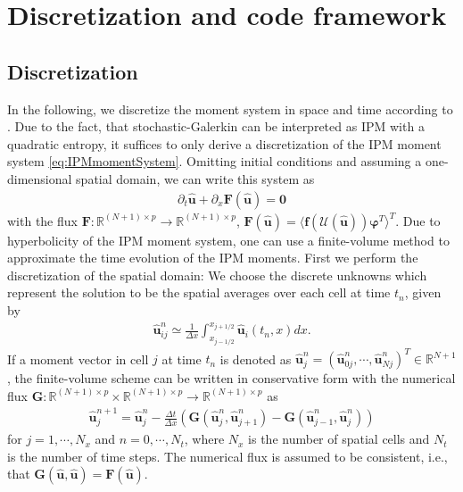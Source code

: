 \section{Discretization and code framework}
\label{sec:framework}
\subsection{Discretization}
In the following, we discretize the moment system in space and time according to \cite{kusch2017maximum}. Due to the fact, that stochastic-Galerkin can be interpreted as IPM with a quadratic entropy, it suffices to only derive a discretization of the IPM moment system \eqref{eq:IPMmomentSystem}.  
Omitting initial conditions and assuming a one-dimensional spatial domain, we can write this system  as
\begin{align*}
\partial_t \bm{\hat u}+\partial_x \bm{F}(\bm{\hat u}) = \bm{0}
\end{align*}
with the flux $\bm{F}:\mathbb{R}^{(N+1)\times p}\to\mathbb{R}^{(N+1)\times p}$, $\bm{F}(\bm{\hat u})=\langle \bm f(\mathcal{U}(\bm{\hat u}))\bm{\varphi}^T \rangle^T$. Due to hyperbolicity of the IPM moment system, one can use a finite-volume method to approximate the time evolution of the IPM moments. First we perform the discretization of the spatial domain: We choose the discrete unknowns which represent the solution to be the spatial averages over each cell at time $t_n$, given by
\begin{align*}
\bm{\hat u}_{ij}^n \simeq \frac{1}{\Delta x}\int_{x_{j-1/ 2}}^{x_{j+1/ 2}}\bm{\hat u}_i(t_n,x) dx.
\end{align*}
If a moment vector in cell $j$ at time $t_n$ is denoted as $\bm{\hat u}_j^n = (\bm{\hat u}_{0j}^n,\cdots,\bm{\hat u}_{Nj}^n)^T\in\mathbb{R}^{N+1}$, the finite-volume scheme can be written in conservative form with the numerical flux $\bm{G}:\mathbb{R}^{(N+1)\times p}\times\mathbb{R}^{(N+1)\times p}\to\mathbb{R}^{(N+1)\times p}$ as
\begin{align}\label{eq:IPMDiscretization}
\bm{\hat u}_{j}^{n+1} = \bm{\hat u}_{j}^{n}  - \frac{\Delta t}{\Delta x}\left( \bm{G}(\bm{\hat u}_{j}^{n},\bm{\hat u}_{j+1}^{n})- \bm{G}(\bm{\hat u}_{j-1}^{n},\bm{\hat u}_{j}^{n})\right)
\end{align}
for $j = 1,\cdots,N_x$ and $n = 0,\cdots,N_t$, where $N_x$ is the number of spatial cells and $N_t$ is the number of time steps.
The numerical flux is assumed to be consistent, i.e., that $\bm{G}(\hat{\bm{u}},\hat{\bm{u}})=\bm{F}(\hat{\bm{u}})$.

